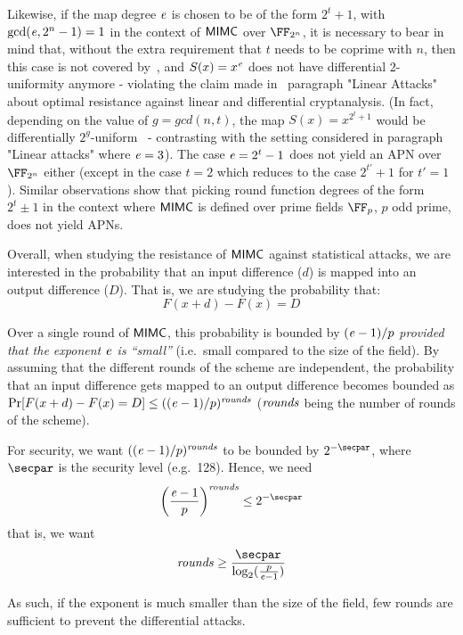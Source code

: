 Likewise, if the map degree $\mathit{e}{}$ is chosen to be of the form $2^t + 1$, with $\gcd(\mathit{e}{}, 2^n - 1) = 1$ in the context of $\mathsf{MIMC{}}$ over $\FF_{2^n}$, it is necessary to bear in mind that, without the extra requirement that $t$ needs to be coprime with $n$, then this case is not covered by~\cite[Theorem 2]{DBLP:journals/tit/HellesethRS99}, and $S(x) = x^{\mathit{e}}{}$ does not have differential 2-uniformity anymore - violating the claim made in~\cite[Section 4.2]{albrecht2016mimc} paragraph "Linear Attacks" about optimal resistance against linear and differential cryptanalysis. (In fact, depending on the value of $g = gcd(n, t)$, the map $S(x) = x^{2^t + 1}$ would be differentially $2^g$-uniform~\cite{DBLP:conf/eurocrypt/Nyberg93} - contrasting with the setting considered in paragraph "Linear attacks" where $\mathit{e}{} = 3$).
The case $\mathit{e}{} = 2^t - 1$ does not yield an APN over $\FF_{2^n}$ either (except in the case $t = 2$ which reduces to the case $2^{t'} + 1$ for $t' = 1$). Similar observations show that picking round function degrees of the form $2^t \pm 1$ in the context where $\mathsf{MIMC{}}$ is defined over prime fields $\FF_p$, $p$ odd prime, does not yield APNs.

\medskip

Overall, when studying the resistance of $\mathsf{MIMC{}}$ against statistical attacks, we are interested in the probability that an input difference ($d$) is mapped into an output difference ($D$). That is, we are studying the probability that:
\[
    F(x + d) - F(x) = D
\]

Over a single round of $\mathsf{MIMC{}}$, this probability is bounded by $(\mathit{e}{}-1)/p$ \emph{provided that the exponent $\mathit{e}{}$ is ``small''} (i.e.~small compared to the size of the field).
By assuming that the different rounds of the scheme are independent, the probability that an input difference gets mapped to an output difference becomes bounded as $\Pr[F(x + d) - F(x) = D] \leq ((\mathit{e}{}-1)/p)^{\mathit{rounds}}$ ($\mathit{rounds}$ being the number of rounds of the scheme).

For security, we want $((\mathit{e}{}-1)/p)^{\mathit{rounds}}$ to be bounded by $2^{-\secpar}$, where $\secpar$ is the security level (e.g.~128). Hence, we need
\[
    \left(\frac{\exponent{}-1}{p}\right)^\rounds \leq 2^{-\secpar}
\]
that is, we want
\[
    \rounds \geq \frac{\secpar}{\log_2(\frac{p}{\exponent{}-1})}
\]

As such, if the exponent is much smaller than the size of the field, few rounds are sufficient to prevent the differential attacks.

